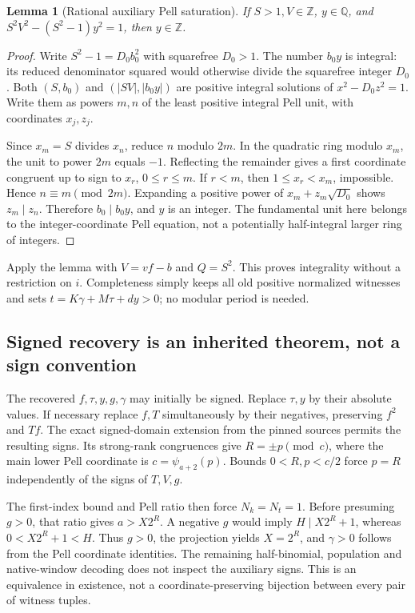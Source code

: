 \documentclass[11pt]{article}
\newcommand{\Z}{\mathbb Z}
\newtheorem{lemma}{Lemma}
\begin{document}
\begin{lemma}[Rational auxiliary Pell saturation]\label{lem:saturation}
If $S>1,V\in\Z$, $y\in\mathbb Q$, and
$S^2V^2-(S^2-1)y^2=1$, then $y\in\Z$.
\end{lemma}
\begin{proof}
Write $S^2-1=D_0b_0^2$ with squarefree $D_0>1$. The number $b_0y$ is integral: its reduced denominator squared would otherwise divide the squarefree integer $D_0$. Both $(S,b_0)$ and $(|SV|,|b_0y|)$ are positive integral solutions of $x^2-D_0z^2=1$. Write them as powers $m,n$ of the least positive integral Pell unit, with coordinates $x_j,z_j$.

Since $x_m=S$ divides $x_n$, reduce $n$ modulo $2m$. In the quadratic ring modulo $x_m$, the unit to power $2m$ equals $-1$. Reflecting the remainder gives a first coordinate congruent up to sign to $x_r$, $0\le r\le m$. If $r<m$, then $1\le x_r<x_m$, impossible. Hence $n\equiv m\pmod{2m}$. Expanding a positive power of $x_m+z_m\sqrt{D_0}$ shows $z_m\mid z_n$. Therefore $b_0\mid b_0y$, and $y$ is an integer. The fundamental unit here belongs to the integer-coordinate Pell equation, not a potentially half-integral larger ring of integers.
\end{proof}
Apply the lemma with $V=vf-b$ and $Q=S^2$. This proves integrality without a restriction on $i$. Completeness simply keeps all old positive normalized witnesses and sets $t=K\gamma+M\tau+dy>0$; no modular period is needed.

\subsection{Signed recovery is an inherited theorem, not a sign convention}
The recovered $f,\tau,y,g,\gamma$ may initially be signed. Replace $\tau,y$ by their absolute values. If necessary replace $f,T$ simultaneously by their negatives, preserving $f^2$ and $Tf$. The exact signed-domain extension from the pinned sources permits the resulting signs. Its strong-rank congruences give $R=\pm p\pmod c$, where the main lower Pell coordinate is $c=\psi_{a+2}(p)$. Bounds $0<R,p<c/2$ force $p=R$ independently of the signs of $T,V,g$.

The first-index bound and Pell ratio then force $N_k=N_t=1$. Before presuming $g>0$, that ratio gives $a>X2^R$. A negative $g$ would imply $H\mid X2^R+1$, whereas $0<X2^R+1<H$. Thus $g>0$, the projection yields $X=2^R$, and $\gamma>0$ follows from the Pell coordinate identities. The remaining half-binomial, population and native-window decoding does not inspect the auxiliary signs. This is an equivalence in existence, not a coordinate-preserving bijection between every pair of witness tuples.
\end{document}
